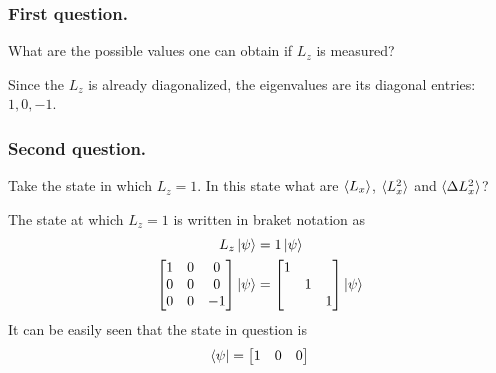 \documentclass[../../../main.tex]{subfiles}
\begin{document}
\subsubsection{First question.}
What are the possible values one can obtain if $L_z$ is measured?

Since the $L_z$ is already diagonalized, the eigenvalues are its diagonal entries: $1,0,-1$.

\subsubsection{Second question.}
Take the state in which $L_z=1$.
In this state what are $\braket{L_x}$, $\braket{L_x^2}$ and $\braket{\Delta L_x^2}$?

The state at which $L_z=1$ is written in braket notation as
\begin{align*}
    L_z \ket{\psi} & =  1 \ket{\psi} \\
    \begin{bmatrix}
        1 & 0 & 0  \\
        0 & 0 & 0  \\
        0 & 0 & -1 \\
    \end{bmatrix}
    \ket{\psi}     & =
    \begin{bmatrix}
        1 &   &   \\
          & 1 &   \\
          &   & 1 \\
    \end{bmatrix}
    \ket{\psi}
\end{align*}
It can be easily seen that the state in question is
\begin{align*}
    \bra{\psi}=\begin{bmatrix}
                   1 & 0 & 0
               \end{bmatrix}
\end{align*}
\end{document}
